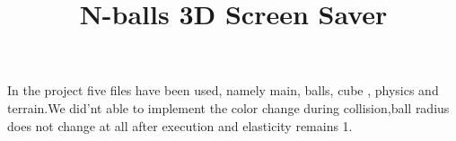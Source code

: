\documentclass[]{article}
\begin{document}
\title{ \textbf{N-balls 3D Screen Saver}}
\date{}
\maketitle





\begin{flushleft}

In the project five files have been used, namely main, balls, cube , physics and terrain.We did'nt able to implement the color change during collision,ball radius does not change at all after execution and elasticity remains 1.   
\end{flushleft}
\end{document}

